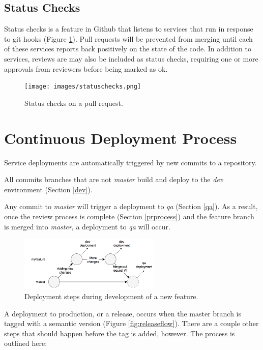 \documentclass[a4paper,12pt,titlepage]{scrartcl}
\begin{document}
	\subsection{Status Checks}
	
	Status checks is a feature in Github that listens to services that run in response to git hooks (Figure \ref{fig:statuschecks}).
	Pull requests will be prevented from merging until each of these services reports back positively on the state of the code.
	In addition to services, reviews are may also be included as status checks, requiring one or more approvals from reviewers before being marked as ok.
   
   	\begin{figure}
  		\centering
    		\texttt{[image: images/statuschecks.png]}
    		\caption{Status checks on a pull request.}
    		\label{fig:statuschecks}
   	\end{figure}
   	
   	\pagebreak
   	
	\section{Continuous Deployment Process}
	
	Service deployments are automatically triggered by new commits to a repository.
	
	All commits branches that are not {\em master} build and deploy to the {\em dev} environment (Section \ref{dev}).
	
	Any commit to {\em master} will trigger a deployment to {\em qa} (Section \ref{qa}).
	As a result, once the review process is complete (Section \ref{prprocess}) and the feature branch is merged into {\em master}, a deployment to {\em qa} will occur.
	
	
	\begin{figure}[t]
  			\centering
    			\includegraphics[width=0.6\textwidth]{images/gitflow-Page-1.png}
    			\caption{Deployment steps during development of a new feature.}
    			\label{fig:devflow}
   	\end{figure}
   	
   	A deployment to production, or a release, occurs when the master branch is tagged with a semantic version (Figure \ref{fig:releaseflow}).
   	There are a couple other steps that should happen before the tag is added, however.
   	The process is outlined here:
   	
\end{document}
